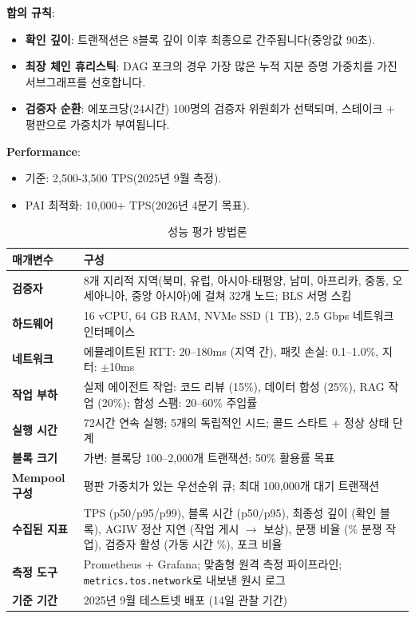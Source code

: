\documentclass[11pt]{article}
\begin{document}
\textbf{합의 규칙}:
\begin{itemize}[noitemsep]
  \item \textbf{확인 깊이}: 트랜잭션은 8블록 깊이 이후 최종으로 간주됩니다(중앙값 90초).
  \item \textbf{최장 체인 휴리스틱}: DAG 포크의 경우 가장 많은 누적 지분 증명 가중치를 가진 서브그래프를 선호합니다.
  \item \textbf{검증자 순환}: 에포크당(24시간) 100명의 검증자 위원회가 선택되며, 스테이크 + 평판으로 가중치가 부여됩니다.
\end{itemize}

\textbf{Performance}:
\begin{itemize}[noitemsep]
  \item 기준: 2,500-3,500 TPS(2025년 9월 측정).
  \item PAI 최적화: 10,000+ TPS(2026년 4분기 목표).
\end{itemize}

\begin{table}[H]
\centering
\caption{성능 평가 방법론}
\label{tab:evaluation-methodology}
\begin{tabular}{@{}p{}p{}@{}}
\toprule
\textbf{매개변수} & \textbf{구성} \\ \midrule
\textbf{검증자} & 8개 지리적 지역(북미, 유럽, 아시아-태평양, 남미, 아프리카, 중동, 오세아니아, 중앙 아시아)에 걸쳐 32개 노드; BLS 서명 스킴 \\
\textbf{하드웨어} & 16 vCPU, 64 GB RAM, NVMe SSD (1 TB), 2.5 Gbps 네트워크 인터페이스 \\
\textbf{네트워크} & 에뮬레이트된 RTT: 20--180ms (지역 간), 패킷 손실: 0.1--1.0\%, 지터: $\pm$10ms \\
\textbf{작업 부하} & 실제 에이전트 작업: 코드 리뷰 (15\%), 데이터 합성 (25\%), RAG 작업 (20\%); 합성 스팸: 20--60\% 주입률 \\
\textbf{실행 시간} & 72시간 연속 실행; 5개의 독립적인 시드; 콜드 스타트 + 정상 상태 단계 \\
\textbf{블록 크기} & 가변: 블록당 100--2,000개 트랜잭션; 50\% 활용률 목표 \\
\textbf{Mempool 구성} & 평판 가중치가 있는 우선순위 큐; 최대 100,000개 대기 트랜잭션 \\
\textbf{수집된 지표} & TPS (p50/p95/p99), 블록 시간 (p50/p95), 최종성 깊이 (확인 블록), AGIW 정산 지연 (작업 게시 $\rightarrow$ 보상), 분쟁 비율 (\% 분쟁 작업), 검증자 활성 (가동 시간 \%), 포크 비율 \\
\textbf{측정 도구} & Prometheus + Grafana; 맞춤형 원격 측정 파이프라인; \texttt{metrics.tos.network}로 내보낸 원시 로그 \\
\textbf{기준 기간} & 2025년 9월 테스트넷 배포 (14일 관찰 기간) \\
\bottomrule
\end{tabular}
\end{table}
\end{document}
